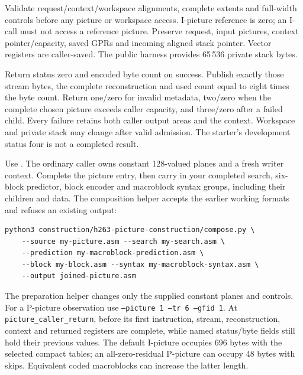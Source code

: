 Validate request/context/workspace alignments, complete extents and full-width
controls before any picture or workspace access. I-picture reference is zero;
an I-call must not access a reference picture. Preserve request, input pictures,
context pointer/capacity, saved GPRs and incoming aligned stack pointer. Vector
registers are caller-saved. The public harness provides 65\,536 private stack bytes.

Return status zero and encoded byte count on success. Publish exactly those
stream bytes, the complete reconstruction and used count equal to eight times
the byte count. Return one/zero for invalid metadata, two/zero when the complete
chosen picture exceeds caller capacity, and three/zero after a failed child.
Every failure retains both caller output areas and the context. Workspace and
private stack may change after valid admission. The starter's development status
four is not a completed result.

Use . The ordinary caller owns
constant 128-valued planes and a fresh writer context. Complete the picture entry,
then carry in your completed search, six-block predictor, block encoder and
macroblock syntax groups, including their children and data. The composition
helper accepts the earlier working formats and refuses an existing output:
\begin{verbatim}
python3 construction/h263-picture-construction/compose.py \
    --source my-picture.asm --search my-search.asm \
    --prediction my-macroblock-prediction.asm \
    --block my-block.asm --syntax my-macroblock-syntax.asm \
    --output joined-picture.asm
\end{verbatim}
The preparation helper changes only the supplied constant planes and controls.
For a P-picture observation use \texttt{--picture 1 --tr 6 --gfid 1}. At
\texttt{picture\_caller\_return}, before its first instruction, stream, reconstruction,
context and returned registers are complete, while named status/byte fields still
hold their previous values. The default I-picture occupies 696 bytes with the
selected compact tables; an all-zero-residual P-picture can occupy 48 bytes with
skips. Equivalent coded macroblocks can increase the latter length.
